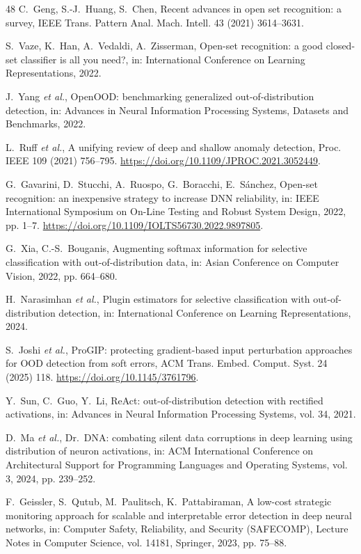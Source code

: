 \documentclass{ieeeaccess}
\begin{document}
\begin{thebibliography}{48}
 C.~Geng, S.-J.~Huang, S.~Chen, Recent advances in open set recognition: a survey, IEEE Trans. Pattern Anal. Mach. Intell. 43 (2021) 3614--3631.

 S.~Vaze, K.~Han, A.~Vedaldi, A.~Zisserman, Open-set recognition: a good closed-set classifier is all you need?, in: International Conference on Learning Representations, 2022.

 J.~Yang \textit{et al.}, OpenOOD: benchmarking generalized out-of-distribution detection, in: Advances in Neural Information Processing Systems, Datasets and Benchmarks, 2022.

 L.~Ruff \textit{et al.}, A unifying review of deep and shallow anomaly detection, Proc. IEEE 109 (2021) 756--795. \url{https://doi.org/10.1109/JPROC.2021.3052449}.

 G.~Gavarini, D.~Stucchi, A.~Ruospo, G.~Boracchi, E.~S\'{a}nchez, Open-set recognition: an inexpensive strategy to increase DNN reliability, in: IEEE International Symposium on On-Line Testing and Robust System Design, 2022, pp. 1--7. \url{https://doi.org/10.1109/IOLTS56730.2022.9897805}.

 G.~Xia, C.-S.~Bouganis, Augmenting softmax information for selective classification with out-of-distribution data, in: Asian Conference on Computer Vision, 2022, pp. 664--680.

 H.~Narasimhan \textit{et al.}, Plugin estimators for selective classification with out-of-distribution detection, in: International Conference on Learning Representations, 2024.

 S.~Joshi \textit{et al.}, ProGIP: protecting gradient-based input perturbation approaches for OOD detection from soft errors, ACM Trans. Embed. Comput. Syst. 24 (2025) 118. \url{https://doi.org/10.1145/3761796}.

 Y.~Sun, C.~Guo, Y.~Li, ReAct: out-of-distribution detection with rectified activations, in: Advances in Neural Information Processing Systems, vol. 34, 2021.

 D.~Ma \textit{et al.}, Dr.\ DNA: combating silent data corruptions in deep learning using distribution of neuron activations, in: ACM International Conference on Architectural Support for Programming Languages and Operating Systems, vol. 3, 2024, pp. 239--252.

 F.~Geissler, S.~Qutub, M.~Paulitsch, K.~Pattabiraman, A low-cost strategic monitoring approach for scalable and interpretable error detection in deep neural networks, in: Computer Safety, Reliability, and Security (SAFECOMP), Lecture Notes in Computer Science, vol. 14181, Springer, 2023, pp. 75--88.


\end{thebibliography}
\end{document}
